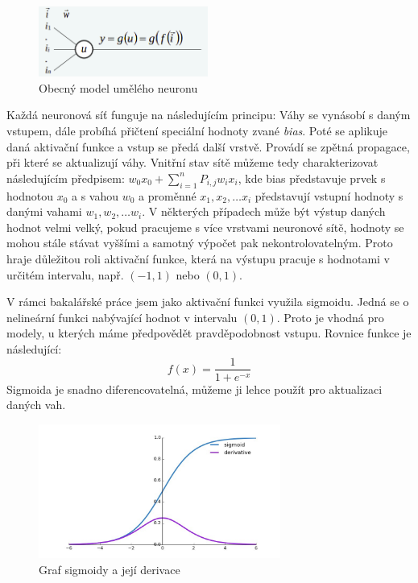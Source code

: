 \begin{figure}[!htbp]
    \centering
    \includegraphics[width=210px]{obrazky-figures/neuron.png}
    \caption{Obecný model umělého neuronu \cite{PrednaskaIZU9}}
\end{figure}

Každá neuronová síť funguje na následujícím principu: Váhy se vynásobí s daným vstupem, dále probíhá přičtení speciální hodnoty zvané \textit{bias}. Poté se aplikuje daná aktivační funkce a vstup se předá další vrstvě. Provádí se zpětná propagace, při které se aktualizují váhy. Vnitřní stav sítě můžeme tedy charakterizovat následujícím předpisem: $w_0x_0 + \sum_{i=1}^{n}P_{i,j}w_ix_i$, kde bias představuje prvek s hodnotou $x_0$ a s vahou $w_0$ a proměnné $x_1, x_2,\ldots x_i$ představují vstupní hodnoty s danými vahami $w_1, w_2, \ldots w_i$. V některých případech může být výstup daných hodnot velmi velký, pokud pracujeme s více vrstvami neuronové sítě, hodnoty se mohou stále stávat vyššími a samotný výpočet pak nekontrolovatelným. Proto hraje důležitou roli aktivační funkce, která na výstupu pracuje s hodnotami v určitém intervalu, např. $(-1, 1)$ nebo $(0, 1)$. \cite{MediumDeepLearning} 

V rámci bakalářské práce jsem jako aktivační funkci využila sigmoidu. Jedná se o nelineární funkci nabývající hodnot v intervalu $(0, 1)$. Proto je vhodná pro modely, u kterých máme předpovědět pravděpodobnost vstupu. Rovnice funkce je následující:
$$f(x)=\frac{1}{1+e^{-x}}$$
Sigmoida je snadno diferencovatelná, můžeme ji lehce použít pro aktualizaci daných vah.

\begin{figure}[!htbp]
    \centering
    \includegraphics[width=300px]{obrazky-figures/sigmoid.jpeg}
    \caption{Graf sigmoidy a její derivace \cite{MediumDeepLearning}}
\end{figure}

